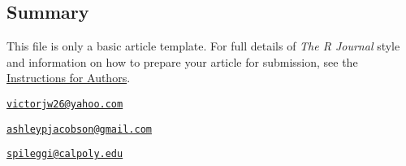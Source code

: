 \hypertarget{summary}{%
\subsection{Summary}\label{summary}}

This file is only a basic article template. For full details of
\emph{The R Journal} style and information on how to prepare your
article for submission, see the
\href{https://journal.r-project.org/share/author-guide.pdf}{Instructions
for Authors}.




\address{%
Victor Wilson\\
California Polytechnic State University, San Luis Obispo - Statistics
Department\\
\\
}
\href{mailto:victorjw26@yahoo.com}{\nolinkurl{victorjw26@yahoo.com}}

\address{%
Ashley Jacobson\\
California Polytechnic State University, San Luis Obispo - Statistics
Department\\
\\
}
\href{mailto:ashleypjacobson@gmail.com}{\nolinkurl{ashleypjacobson@gmail.com}}

\address{%
Shannon Pileggi\\
California Polytechnic State University, San Luis Obispo - Statistics
Department\\
\\
}
\href{mailto:spileggi@calpoly.edu}{\nolinkurl{spileggi@calpoly.edu}}

